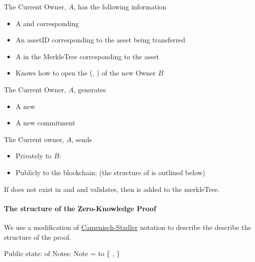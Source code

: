 The Current Owner, $A$, has the following information
\begin{itemize}
    \item A  and corresponding 
    \item An assetID corresponding to the asset being transferred
    \item A  in the MerkleTree corresponding to the asset
    \item Knows how to open the  (, )  of the new Owner $B$
\end{itemize}

The Current Owner, $A$, generates
\begin{itemize}
    \item A new 
    \item A new commitment 
\end{itemize}

The Current owner, $A$, sends
\begin{itemize}
    \item Privately to $B$: 
    \item Publicly to the blockchain:  (the structure of  is outlined below)
\end{itemize}

If  does not exist in  and and  validates, then  is added to the merkleTree.


\paragraph[:]{The structure of the Zero-Knowledge Proof}
We use a modification of \href{https://www.research-collection.ethz.ch/bitstream/handle/20.500.11850/69316/eth-3353-01.pdf}{Camenisch-Stadler} notation to describe the describe the structure of the proof.


Public state:  of Notes:
Note =  to \{ ,  \}

